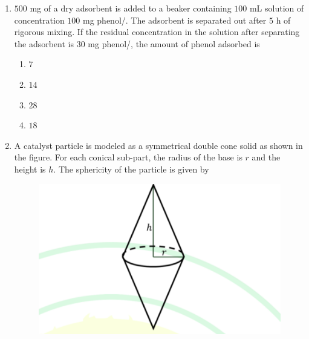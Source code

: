 \documentclass[journal,12pt,onecolumn]{IEEEtran}
\theoremstyle{remark}
\begin{document}
\begin{enumerate}
		\hfill{}
		
		\begin{multicols}{4}
			\begin{enumerate}
				\item $1.2$
				\item $0.4$
				\item $0.6$
				\item $0.8$
			\end{enumerate}
		\end{multicols}
		
		\item $500$ mg of a dry adsorbent is added to a beaker containing $100$ mL solution of concentration $100$ mg phenol/. The adsorbent is separated out after $5$ h of rigorous mixing. If the residual concentration in the solution after separating the adsorbent is $30$ mg phenol/, the amount of phenol adsorbed  is
		
		\hfill{}
		
		\begin{multicols}{4}
			\begin{enumerate}
				\item $7$
				\item $14$
				\item $28$
				\item $18$
			\end{enumerate}
		\end{multicols}
		
		\item A catalyst particle is modeled as a symmetrical double cone solid as shown in the figure. For each conical sub-part, the radius of the base is $r$ and the height is $h$. The sphericity of the particle is given by
				\begin{figure}[h]
			\centering
			\includegraphics[width=0.6\columnwidth]{q41.png}
			\caption*{}
			\label{fig:q41}
		\end{figure}
		

\end{enumerate}
\end{document}
